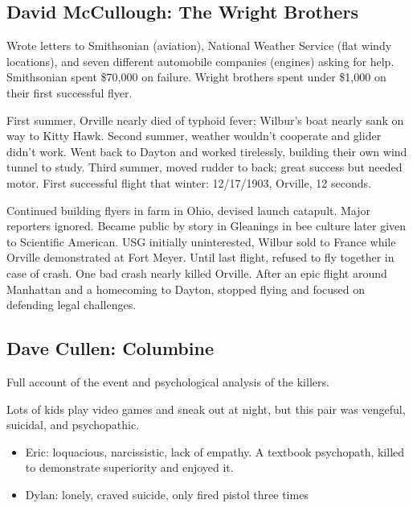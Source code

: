 \documentclass[
]{article}
\begin{document}
\hypertarget{david-mccullough-the-wright-brothers}{%
\subsection{David McCullough: The Wright
Brothers}\label{david-mccullough-the-wright-brothers}}

Wrote letters to Smithsonian (aviation), National Weather Service (flat
windy locations), and seven different automobile companies (engines)
asking for help. Smithsonian spent \$70,000 on failure. Wright brothers
spent under \$1,000 on their first successful flyer.

First summer, Orville nearly died of typhoid fever; Wilbur's boat nearly
sank on way to Kitty Hawk. Second summer, weather wouldn't cooperate and
glider didn't work. Went back to Dayton and worked tirelessly, building
their own wind tunnel to study. Third summer, moved rudder to back;
great success but needed motor. First successful flight that winter:
12/17/1903, Orville, 12 seconds.

Continued building flyers in farm in Ohio, devised launch catapult.
Major reporters ignored. Became public by story in Gleanings in bee
culture later given to Scientific American. USG initially uninterested,
Wilbur sold to France while Orville demonstrated at Fort Meyer. Until
last flight, refused to fly together in case of crash. One bad crash
nearly killed Orville. After an epic flight around Manhattan and a
homecoming to Dayton, stopped flying and focused on defending legal
challenges.

\hypertarget{dave-cullen-columbine}{%
\subsection{Dave Cullen: Columbine}\label{dave-cullen-columbine}}

Full account of the event and psychological analysis of the killers.

Lots of kids play video games and sneak out at night, but this pair was
vengeful, suicidal, and psychopathic.

\begin{itemize}
\item
  Eric: loquacious, narcissistic, lack of empathy. A textbook
  psychopath, killed to demonstrate superiority and enjoyed it.
\item
  Dylan: lonely, craved suicide, only fired pistol three times
\end{itemize}
\end{document}
